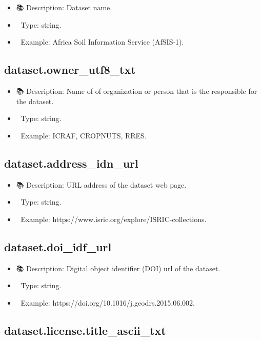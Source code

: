 \documentclass[
  letterpaper,
  DIV=11,
  numbers=noendperiod]{scrreprt}
\providecommand{\tightlist}{%
  \setlength{\itemsep}{0pt}\setlength{\parskip}{0pt}}\usepackage{longtable,booktabs,array}
\begin{document}
\begin{itemize}
\tightlist
\item
  📚 Description: Dataset name.
\item
  🔢 Type: string.
\item
  📖 Example: Africa Soil Information Service (AfSIS-1).
\end{itemize}

\subsection{dataset.owner\_utf8\_txt}\label{dataset.owner_utf8_txt}

\begin{itemize}
\tightlist
\item
  📚 Description: Name of of organization or person that is the
  responsible for the dataset.
\item
  🔢 Type: string.
\item
  📖 Example: ICRAF, CROPNUTS, RRES.
\end{itemize}

\subsection{dataset.address\_idn\_url}\label{dataset.address_idn_url}

\begin{itemize}
\tightlist
\item
  📚 Description: URL address of the dataset web page.
\item
  🔢 Type: string.
\item
  📖 Example: https://www.isric.org/explore/ISRIC-collections.
\end{itemize}

\subsection{dataset.doi\_idf\_url}\label{dataset.doi_idf_url}

\begin{itemize}
\tightlist
\item
  📚 Description: Digital object identifier (DOI) url of the dataset.
\item
  🔢 Type: string.
\item
  📖 Example: https://doi.org/10.1016/j.geodrs.2015.06.002.
\end{itemize}

\subsection{dataset.license.title\_ascii\_txt}\label{dataset.license.title_ascii_txt}
\end{document}
